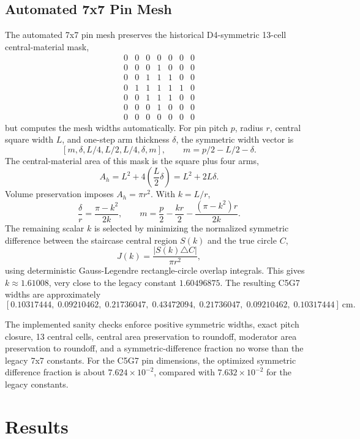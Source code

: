 \documentclass[11pt]{article}
\begin{document}
\subsection*{Automated 7x7 Pin Mesh}

The automated 7x7 pin mesh preserves the historical D4-symmetric 13-cell
central-material mask,
\[
\begin{array}{ccccccc}
0&0&0&0&0&0&0\\
0&0&0&1&0&0&0\\
0&0&1&1&1&0&0\\
0&1&1&1&1&1&0\\
0&0&1&1&1&0&0\\
0&0&0&1&0&0&0\\
0&0&0&0&0&0&0
\end{array}
\]
but computes the mesh widths automatically.  For pin pitch \(p\), radius \(r\),
central square width \(L\), and one-step arm thickness \(\delta\), the symmetric
width vector is
\[
  [m,\delta,L/4,L/2,L/4,\delta,m],
  \qquad
  m = p/2 - L/2 - \delta .
\]
The central-material area of this mask is the square plus four arms,
\[
  A_h = L^2 + 4\left(\frac{L}{2}\delta\right)
      = L^2 + 2L\delta .
\]
Volume preservation imposes \(A_h = \pi r^2\).  With \(k=L/r\),
\[
  \frac{\delta}{r} = \frac{\pi-k^2}{2k},
  \qquad
  m = \frac{p}{2} - \frac{kr}{2}
      - \frac{(\pi-k^2)r}{2k}.
\]
The remaining scalar \(k\) is selected by minimizing the normalized symmetric
difference between the staircase central region \(S(k)\) and the true circle
\(C\),
\[
  J(k) = \frac{|S(k)\triangle C|}{\pi r^2},
\]
using deterministic Gauss-Legendre rectangle-circle overlap integrals.  This
gives \(k \approx 1.61008\), very close to the legacy constant \(1.60496875\).
The resulting C5G7 widths are approximately
\[
 [0.10317444,\; 0.09210462,\; 0.21736047,\; 0.43472094,\;
  0.21736047,\; 0.09210462,\; 0.10317444]\ \mathrm{cm}.
\]

The implemented sanity checks enforce positive symmetric widths, exact pitch
closure, 13 central cells, central area preservation to roundoff, moderator area
preservation to roundoff, and a symmetric-difference fraction no worse than the
legacy 7x7 constants.  For the C5G7 pin dimensions, the optimized symmetric
difference fraction is about \(7.624\times10^{-2}\), compared with
\(7.632\times10^{-2}\) for the legacy constants.

\section*{Results}
\end{document}
